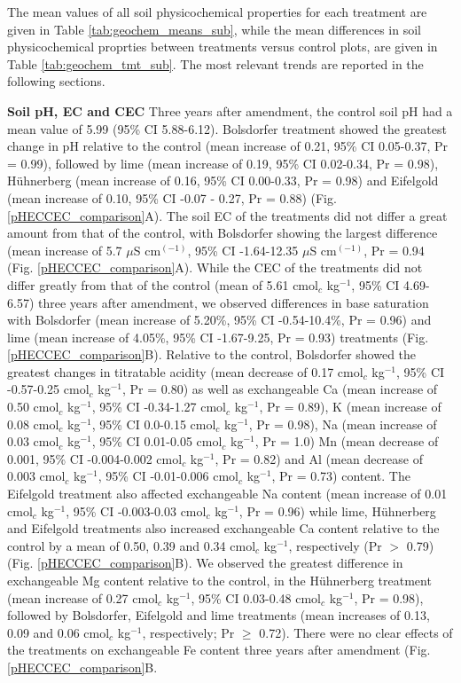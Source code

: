 \documentclass[preprint,12pt]{elsarticle}
\begin{document}
The mean values of all soil physicochemical properties for each treatment are given in Table \ref{tab:geochem_means_sub}, while the mean differences in soil physicochemical proprties between treatments versus control plots, are given in Table \ref{tab:geochem_tmt_sub}. The most relevant trends are reported in the following sections.
    
\textbf{Soil pH, EC and CEC}
  Three years after amendment, the control soil pH had a mean value of 5.99 (95\% CI 5.88-6.12). Bolsdorfer treatment showed the greatest change in pH relative to the control (mean increase of 0.21, 95\% CI 0.05-0.37, Pr = 0.99), followed by lime (mean increase of 0.19, 95\% CI 0.02-0.34, Pr = 0.98), Hühnerberg (mean increase of 0.16, 95\% CI 0.00-0.33, Pr = 0.98) and Eifelgold (mean increase of 0.10, 95\% CI -0.07 - 0.27, Pr = 0.88) (Fig. \ref{pHECCEC_comparison}A). 
  The soil EC of the treatments did not differ a great amount from that of the control, with Bolsdorfer showing the largest difference (mean increase of 5.7 $\mu$S cm$^(-1)$, 95\% CI -1.64-12.35 $\mu$S cm$^(-1)$, Pr = 0.94 (Fig. \ref{pHECCEC_comparison}A).
  While the CEC of the treatments did not differ greatly from that of the control (mean of 5.61 cmol$_c$ kg$^{-1}$, 95\% CI 4.69-6.57) three years after amendment, we observed  differences in base saturation with Bolsdorfer (mean increase of 5.20\%, 95\% CI -0.54-10.4\%, Pr = 0.96) and lime (mean increase of 4.05\%, 95\% CI -1.67-9.25, Pr = 0.93) treatments (Fig. \ref{pHECCEC_comparison}B).
  Relative to the control, Bolsdorfer showed the greatest changes in titratable acidity (mean decrease of 0.17 cmol$_c$ kg$^{-1}$, 95\% CI -0.57-0.25 cmol$_c$ kg$^{-1}$, Pr = 0.80) as well as exchangeable Ca (mean increase of 0.50 cmol$_c$ kg$^{-1}$, 95\% CI -0.34-1.27 cmol$_c$ kg$^{-1}$, Pr = 0.89), K (mean increase of 0.08 cmol$_c$ kg$^{-1}$, 95\% CI 0.0-0.15 cmol$_c$ kg$^{-1}$, Pr = 0.98), Na (mean increase of 0.03 cmol$_c$ kg$^{-1}$, 95\% CI 0.01-0.05 cmol$_c$ kg$^{-1}$, Pr = 1.0) Mn (mean decrease of 0.001, 95\% CI -0.004-0.002 cmol$_c$ kg$^{-1}$, Pr = 0.82) and Al (mean decrease of 0.003 cmol$_c$ kg$^{-1}$, 95\% CI -0.01-0.006 cmol$_c$ kg$^{-1}$, Pr = 0.73) content. The Eifelgold treatment also affected exchangeable Na content (mean increase of 0.01 cmol$_c$ kg$^{-1}$, 95\% CI -0.003-0.03 cmol$_c$ kg$^{-1}$, Pr = 0.96) while lime, Hühnerberg and Eifelgold treatments also increased exchangeable Ca content relative to the control by a mean of 0.50, 0.39 and 0.34 cmol$_c$ kg$^{-1}$, respectively (Pr $>$ 0.79) (Fig. \ref{pHECCEC_comparison}B).
  We observed the greatest difference in exchangeable Mg content relative to the control, in the Hühnerberg treatment (mean increase of 0.27 cmol$_c$ kg$^{-1}$, 95\% CI 0.03-0.48 cmol$_c$ kg$^{-1}$, Pr = 0.98), followed by Bolsdorfer, Eifelgold and lime treatments (mean increases of 0.13, 0.09 and 0.06 cmol$_c$ kg$^{-1}$, respectively; Pr $\geq$ 0.72). There were no clear effects of the treatments on exchangeable Fe content three years after amendment (Fig. \ref{pHECCEC_comparison}B.
\end{document}
